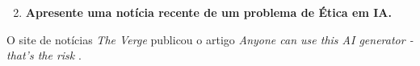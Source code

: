 \begin{enumerate}\setcounter{enumi}{1}\bfseries
    \item \textbf{Apresente uma notícia recente de um problema de Ética em IA.}
\end{enumerate}

O site de notícias \textit{The Verge} publicou o artigo \textit{Anyone can use this AI generator - that's the risk} \cite{verge_ai_generator}. 